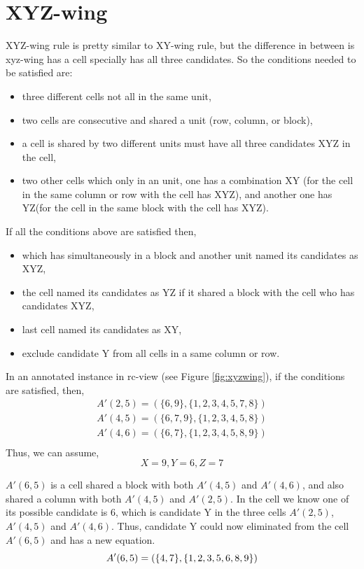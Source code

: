 \documentclass[11pt]{report}
\newcommand{\set}[1]{\{ #1 \}}
\begin{document}
\section{XYZ-wing}
\label{sec:XYZ-wing}

XYZ-wing rule is pretty similar to XY-wing rule, but the difference in between is xyz-wing has a cell specially has all three candidates. So the conditions needed to be satisfied are:
\begin{itemize}
\item three different cells not all in the same unit,
\item two cells are consecutive and shared a unit (row, column, or block),
\item a cell is shared by two different units must have all three candidates XYZ in the cell,
\item two other cells which only in an unit, one has a combination XY (for the cell in the same column or row with the cell has XYZ), and another one has YZ(for the cell in the same block with the cell has XYZ).
\end{itemize}

If all the conditions above are satisfied then,
\begin{itemize}
\item which has simultaneously in a block and another unit named its candidates as XYZ,
\item the cell named its candidates as YZ if it shared a block with the cell who has candidates XYZ,
\item last cell named its candidates as XY,
\item exclude candidate Y from all cells in a same column or row.
\end{itemize}
In an annotated instance in rc-view (see Figure \ref{fig:xyzwing}), if the conditions are satisfied, then,
\begin{eqnarray*}
A'(2,5) = (\set{6, 9}, \set{1, 2, 3, 4, 5, 7, 8})\\
A'(4,5) = (\set{6, 7, 9}, \set{1, 2, 3, 4, 5, 8})\\
A'(4,6) = (\set{6, 7}, \set{1, 2, 3, 4, 5, 8, 9})\\
\end{eqnarray*}
Thus, we can assume,
\begin{displaymath}
X = 9, Y = 6, Z = 7
\end{displaymath}

$A'(6,5)$ is a cell shared a block with both $A'(4,5)$ and $A'(4,6)$, and also shared a column with both $A'(4,5)$ and $A'(2,5)$. In the cell we know one  of its possible candidate is  6, which is candidate Y in the three cells $A'(2,5)$, $A'(4,5)$ and $A'(4,6)$. Thus, candidate Y could now eliminated from the cell $A'(6,5)$ and has a new equation.
\begin{displaymath}
A'(6,5) = (\set{4,7}, \set{1, 2, 3, 5, 6, 8, 9})\\
\end{displaymath}
\end{document}
